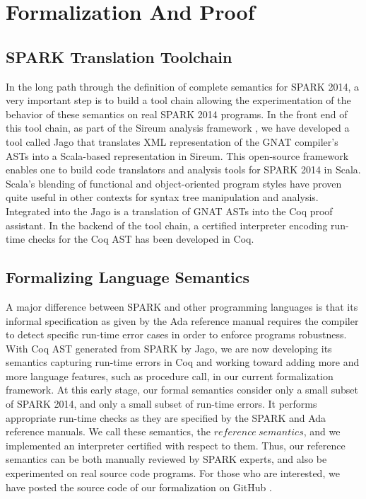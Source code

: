 \section{Formalization And Proof}

\subsection{SPARK Translation Toolchain}
In the long path through the definition of complete semantics for
SPARK 2014, a very important step is to build a tool chain allowing 
the experimentation of the behavior of these semantics on real SPARK
2014 programs. In the front end of this tool chain, as part of the 
Sireum analysis framework \cite{Sireum:URL}, we have developed a tool called Jago
\cite{Jago:URL} that translates XML representation of the GNAT compiler's 
ASTs into a Scala-based 
representation in Sireum.  This open-source framework enables one to build
code translators and analysis tools for SPARK 2014 in Scala.  Scala's 
blending of functional %
and object-oriented program styles have proven 
quite useful in other contexts for syntax tree manipulation and analysis.  
Integrated into the Jago is a translation of GNAT ASTs into the Coq proof 
assistant. In the backend of the tool chain, a certified interpreter 
encoding run-time checks for the Coq AST has been developed in Coq.

\subsection{Formalizing Language Semantics}
A major difference between SPARK and other programming languages is that 
its %
informal specification as given by the Ada reference manual requires the
compiler to detect specific run-time error cases in order to enforce
programs robustness.
 With Coq AST generated from SPARK by Jago, we 
are now developing its semantics capturing run-time errors in Coq and working toward 
adding more and more language features, such as procedure call, in our current 
formalization framework.
At this early stage, our formal semantics consider only a small subset
of SPARK 2014, and only a small subset of run-time errors.  It performs 
appropriate run-time checks as they are specified by the SPARK and Ada 
reference manuals.  We call these semantics, the $\mathit{reference\
semantics}$, and we implemented an interpreter certified with respect to them.
Thus, our reference semantics can be both manually reviewed by SPARK 
experts, and also be experimented on real source code programs.
For those who are interested, we have posted the source code of our
formalization on GitHub \cite{Formalization:URL}.

